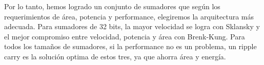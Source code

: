 Por lo tanto, hemos logrado un conjunto de sumadores que según los requerimientos de área, potencia y performance, elegiremos la arquitectura más adecuada. Para sumadores de 32 bits, la mayor velocidad se logra con Sklansky y el mejor compromiso entre velocidad, potencia y área con Brenk-Kung. Para todos los tamaños de sumadores, si la performance no es un problema, un ripple carry es la solución optima de estos tres, ya que ahorra área y energía.








